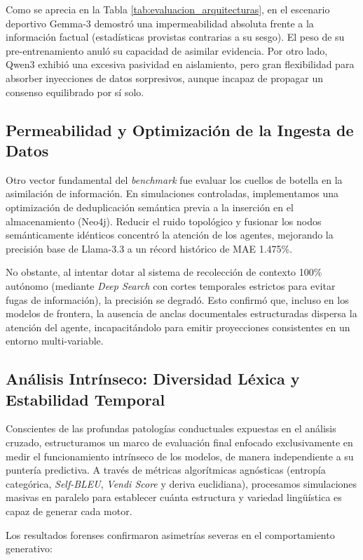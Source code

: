 \documentclass{article}
\begin{document}
Como se aprecia en la Tabla \ref{tab:evaluacion_arquitecturas}, en el escenario deportivo Gemma-3 demostró una impermeabilidad absoluta frente a la información factual (estadísticas provistas contrarias a su sesgo). El peso de su pre-entrenamiento anuló su capacidad de asimilar evidencia. Por otro lado, Qwen3 exhibió una excesiva pasividad en aislamiento, pero gran flexibilidad para absorber inyecciones de datos sorpresivos, aunque incapaz de propagar un consenso equilibrado por sí solo.

\subsection{Permeabilidad y Optimización de la Ingesta de Datos}

Otro vector fundamental del \textit{benchmark} fue evaluar los cuellos de botella en la asimilación de información. En simulaciones controladas, implementamos una optimización de deduplicación semántica previa a la inserción en el almacenamiento (Neo4j). Reducir el ruido topológico y fusionar los nodos semánticamente idénticos concentró la atención de los agentes, mejorando la precisión base de Llama-3.3 a un récord histórico de MAE 1.475\%.

No obstante, al intentar dotar al sistema de recolección de contexto 100\% autónomo (mediante \textit{Deep Search} con cortes temporales estrictos para evitar fugas de información), la precisión se degradó. Esto confirmó que, incluso en los modelos de frontera, la ausencia de anclas documentales estructuradas dispersa la atención del agente, incapacitándolo para emitir proyecciones consistentes en un entorno multi-variable.

\subsection{Análisis Intrínseco: Diversidad Léxica y Estabilidad Temporal}

Conscientes de las profundas patologías conductuales expuestas en el análisis cruzado, estructuramos un marco de evaluación final enfocado exclusivamente en medir el funcionamiento intrínseco de los modelos, de manera independiente a su puntería predictiva. A través de métricas algorítmicas agnósticas (entropía categórica, \textit{Self-BLEU}, \textit{Vendi Score} y deriva euclidiana), procesamos simulaciones masivas en paralelo para establecer cuánta estructura y variedad lingüística es capaz de generar cada motor.

Los resultados forenses confirmaron asimetrías severas en el comportamiento generativo:
\end{document}
